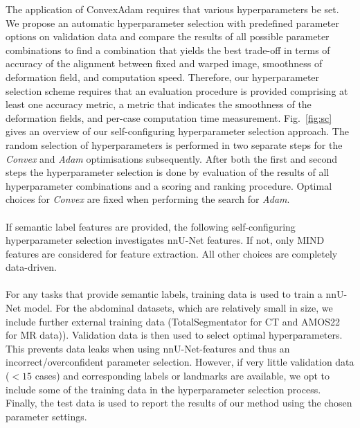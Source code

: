 The application of ConvexAdam requires that various hyperparameters be set. We propose an automatic hyperparameter selection with predefined parameter options on validation data and compare the results of all possible parameter combinations to find a combination that yields the best trade-off in terms of accuracy of the alignment between fixed and warped image, smoothness of deformation field, and computation speed. Therefore, our hyperparameter selection scheme requires that an evaluation procedure is provided comprising at least one accuracy metric, a metric that indicates the smoothness of the deformation fields, and per-case computation time measurement. Fig.~\ref{fig:sc} gives an overview of our self-configuring hyperparameter selection approach. The random selection of hyperparameters is performed in two separate steps for the \emph{Convex} and \emph{Adam} optimisations subsequently. After both the first and second steps the hyperparameter selection is done by evaluation of the results of all hyperparameter combinations and a scoring and ranking procedure. Optimal choices for \emph{Convex} are fixed when performing the search for \emph{Adam}.
\\\\
If semantic label features are provided, the following self-configuring hyperparameter selection investigates nnU-Net features. If not, only MIND features are considered for feature extraction. All other choices are completely data-driven.
\\\\
For any tasks that provide semantic labels, training data is used to train a nnU-Net model. For the abdominal datasets, which are relatively small in size, we include further external training data (TotalSegmentator \citep{wasserthal2022totalsegmentator} for CT and AMOS22 \citep{ji2022amos} for MR data)). Validation data is then used to select optimal hyperparameters. This prevents data leaks when using nnU-Net-features and thus an incorrect/overconfident parameter selection. However, if very little validation data ($<15$ cases) and corresponding labels or landmarks are available, we opt to include some of the training data in the hyperparameter selection process. Finally, the test data is used to report the results of our method using the chosen parameter settings.
\\\\


